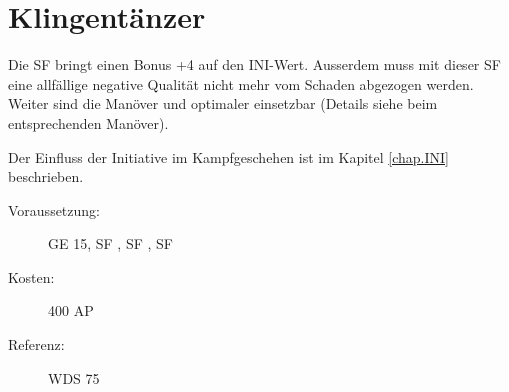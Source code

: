 \section{Klingentänzer}
\label{sf.klingentaenzer}
Die SF  bringt einen Bonus +4 auf den INI-Wert.
Ausserdem muss mit dieser SF eine allfällige negative Qualität nicht mehr vom Schaden abgezogen werden.
Weiter sind die Manöver  und  optimaler einsetzbar (Details siehe beim entsprechenden Manöver).

Der Einfluss der Initiative im Kampfgeschehen ist im Kapitel \ref{chap.INI} beschrieben.
\begin{description}
    \item[Voraussetzung:]
        GE 15, SF , SF , SF 
    \item [Kosten:]
        400 AP
    \item [Referenz:]
        WDS 75
\end{description}
